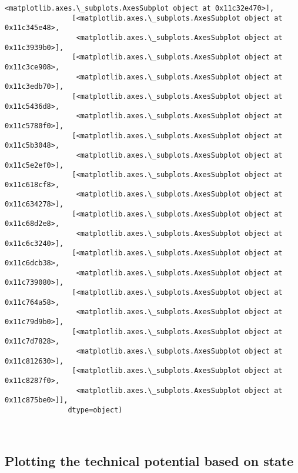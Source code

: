\documentclass[11pt]{article}
\begin{document}
\begin{Verbatim}[commandchars=\\\{\}]
                 <matplotlib.axes.\_subplots.AxesSubplot object at 0x11c32e470>],
                [<matplotlib.axes.\_subplots.AxesSubplot object at 0x11c345e48>,
                 <matplotlib.axes.\_subplots.AxesSubplot object at 0x11c3939b0>],
                [<matplotlib.axes.\_subplots.AxesSubplot object at 0x11c3ce908>,
                 <matplotlib.axes.\_subplots.AxesSubplot object at 0x11c3edb70>],
                [<matplotlib.axes.\_subplots.AxesSubplot object at 0x11c5436d8>,
                 <matplotlib.axes.\_subplots.AxesSubplot object at 0x11c5780f0>],
                [<matplotlib.axes.\_subplots.AxesSubplot object at 0x11c5b3048>,
                 <matplotlib.axes.\_subplots.AxesSubplot object at 0x11c5e2ef0>],
                [<matplotlib.axes.\_subplots.AxesSubplot object at 0x11c618cf8>,
                 <matplotlib.axes.\_subplots.AxesSubplot object at 0x11c634278>],
                [<matplotlib.axes.\_subplots.AxesSubplot object at 0x11c68d2e8>,
                 <matplotlib.axes.\_subplots.AxesSubplot object at 0x11c6c3240>],
                [<matplotlib.axes.\_subplots.AxesSubplot object at 0x11c6dcb38>,
                 <matplotlib.axes.\_subplots.AxesSubplot object at 0x11c739080>],
                [<matplotlib.axes.\_subplots.AxesSubplot object at 0x11c764a58>,
                 <matplotlib.axes.\_subplots.AxesSubplot object at 0x11c79d9b0>],
                [<matplotlib.axes.\_subplots.AxesSubplot object at 0x11c7d7828>,
                 <matplotlib.axes.\_subplots.AxesSubplot object at 0x11c812630>],
                [<matplotlib.axes.\_subplots.AxesSubplot object at 0x11c8287f0>,
                 <matplotlib.axes.\_subplots.AxesSubplot object at 0x11c875be0>]],
               dtype=object)
\end{Verbatim}
            
    \begin{center}
    \end{center}
    { \hspace*{\fill} \\}
    
    \subsection{Plotting the technical potential based on
state}\label{plotting-the-technical-potential-based-on-state}
\end{document}
